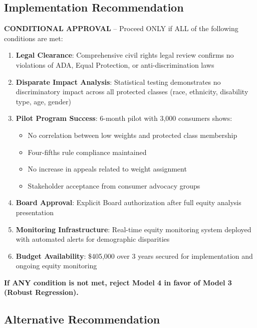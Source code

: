 \subsection{Implementation Recommendation}

\textbf{CONDITIONAL APPROVAL} -- Proceed ONLY if ALL of the following conditions are met:

\begin{enumerate}
    \item \textbf{Legal Clearance}: Comprehensive civil rights legal review confirms no violations of ADA, Equal Protection, or anti-discrimination laws
    
    \item \textbf{Disparate Impact Analysis}: Statistical testing demonstrates no discriminatory impact across all protected classes (race, ethnicity, disability type, age, gender)
    
    \item \textbf{Pilot Program Success}: 6-month pilot with 3,000 consumers shows:
    \begin{itemize}
        \item No correlation between low weights and protected class membership
        \item Four-fifths rule compliance maintained
        \item No increase in appeals related to weight assignment
        \item Stakeholder acceptance from consumer advocacy groups
    \end{itemize}
    
    \item \textbf{Board Approval}: Explicit Board authorization after full equity analysis presentation
    
    \item \textbf{Monitoring Infrastructure}: Real-time equity monitoring system deployed with automated alerts for demographic disparities
    
    \item \textbf{Budget Availability}: \$405,000 over 3 years secured for implementation and ongoing equity monitoring
\end{enumerate}

\textbf{If ANY condition is not met, reject Model 4 in favor of Model 3 (Robust Regression).}

\subsection{Alternative Recommendation}

